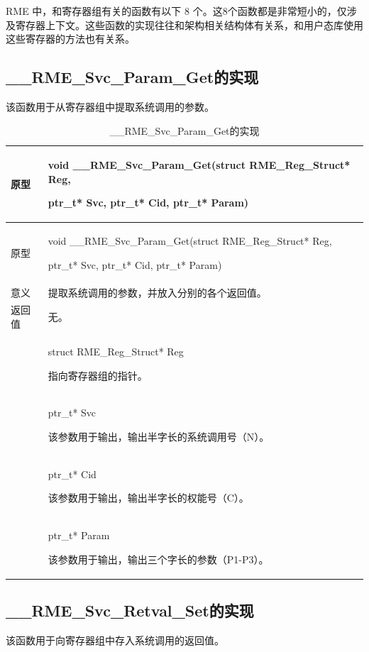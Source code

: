 RME 中，和寄存器组有关的函数有以下 8 个。这8个函数都是非常短小的，仅涉及寄存器上下文。这些函数的实现往往和架构相关结构体有关系，和用户态库使用这些寄存器的方法也有关系。

\subsection{\_\_RME\_Svc\_Param\_Get的实现}\label{subsec:7-rme-svc-param-get-implementation}

该函数用于从寄存器组中提取系统调用的参数。

\begin{xltabular}{\textwidth}{@{}>{\hsize\raggedright\arraybackslash}X>{\hsize\raggedright\arraybackslash}X@{}}
\caption{\_\_RME\_Svc\_Param\_Get的实现}\label{tab:7-61-rme-svc-param-get-implementation}\\
\toprule
原型\strut
 & void \_\_RME\_Svc\_Param\_Get(struct RME\_Reg\_Struct* Reg,

ptr\_t* Svc, ptr\_t* Cid, ptr\_t* Param)\strut
\tabularnewline
\endfirsthead
\toprule
原型\strut
 & void \_\_RME\_Svc\_Param\_Get(struct RME\_Reg\_Struct* Reg,

ptr\_t* Svc, ptr\_t* Cid, ptr\_t* Param)\strut
\tabularnewline
\midrule
\endhead
\bottomrule
\endlastfoot
意义 & 提取系统调用的参数，并放入分别的各个返回值。\tabularnewline
返回值 & 无。\tabularnewline
{} & struct RME\_Reg\_Struct* Reg

指向寄存器组的指针。\strut
\tabularnewline
\strut
 & ptr\_t* Svc

该参数用于输出，输出半字长的系统调用号（N）。\strut
\tabularnewline
\strut
 & ptr\_t* Cid

该参数用于输出，输出半字长的权能号（C）。\strut
\tabularnewline
\strut
 & ptr\_t* Param

该参数用于输出，输出三个字长的参数（P1-P3）。\strut
\tabularnewline
\end{xltabular}

\subsection{\_\_RME\_Svc\_Retval\_Set的实现}\label{subsec:7-rme-svc-retval-set-implementation}

该函数用于向寄存器组中存入系统调用的返回值。

